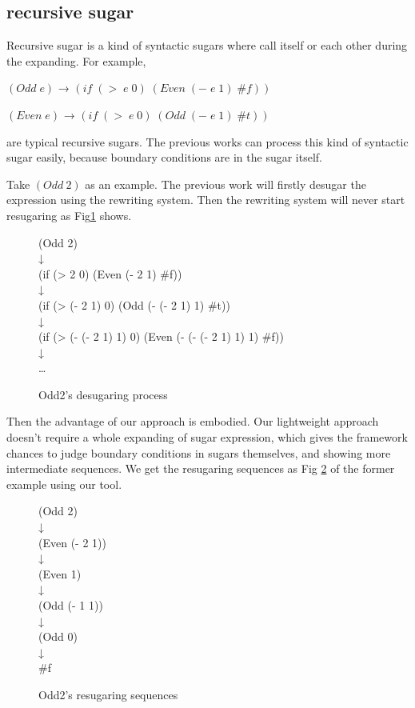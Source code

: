 \subsection{recursive sugar}
Recursive sugar is a kind of syntactic sugars where call itself or each other during the expanding. For example,

$(Odd\;e)$ → $(if\;(>\;e\;0)\;(Even\;(-\;e\;1)\;\#f))$

$(Even\;e)$ → $(if\;(>\;e\;0)\;(Odd\;(-\;e\;1)\;\#t))$

are typical recursive sugars. The previous works can process this kind of syntactic sugar easily, because boundary conditions are in the sugar itself.

Take $(Odd~2)$ as an example. The previous work will firstly desugar the expression using the rewriting system. Then the rewriting system will never start resugaring as Fig\ref{fig:odd} shows.

\begin{figure}[ht]
	\centering
	\parbox[t]{\textwidth}{
				\begin{center}
				{
					\small\selectfont
					(Odd 2)\\
					↓\\
					(if (> 2 0) (Even (- 2 1) \#f))\\
					↓\\
					(if (> (- 2 1) 0) (Odd (- (- 2 1) 1) \#t))\\
					↓\\
					(if (> (- (- 2 1) 1) 0) (Even (- (- (- 2 1) 1) 1) \#f))\\
					↓\\
					{\ldots}
				}
				\end{center}
				
			}
	\caption{Odd2's desugaring process}
\label{fig:odd}
\end{figure}

Then the advantage of our approach is embodied. Our lightweight approach doesn't require a whole expanding of sugar expression, which gives the framework chances to judge boundary conditions in sugars themselves, and showing more intermediate sequences. We get the resugaring sequences as Fig \ref{fig:rec} of the former example using our tool.

\begin{figure}[ht]
	\centering
	\parbox[t]{\textwidth}{
				\begin{center}
				{
					\small\selectfont
					(Odd 2)\\
					↓\\
					(Even (- 2 1))\\
					↓\\
					(Even 1)\\
					↓\\
					(Odd (- 1 1))\\
					↓\\
					(Odd 0)\\
					↓\\
					\#f
				}
				\end{center}
				
			}
	\caption{Odd2's resugaring sequences}
\label{fig:rec}
\end{figure}

